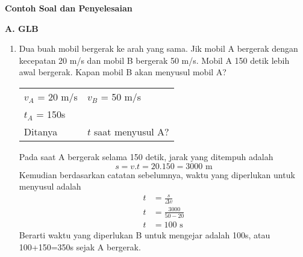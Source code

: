 \documentclass[10pt,a4paper]{article}
\newcommand{\unhide}[1]{
\begin{mybox}
#1\end{mybox}}
\begin{document}
\begin{multicols*}{2}
\begin{enumerate}[label=\Alph*.,topsep=0mm,leftmargin=*]
\end{enumerate}

\begin{catatan}\textbf{Contoh Soal dan Penyelesaian}\end{catatan}
\textbf{A. GLB}
\begin{enumerate}[topsep=0pt,itemsep=0pt,leftmargin=*]
\item Dua buah mobil bergerak ke arah yang sama. Jik mobil A bergerak dengan kecepatan 20 m/s dan mobil B bergerak 50 m/s. Mobil A 150 detik lebih awal bergerak. Kapan mobil B akan menyusul mobil A?

\unhide{
\begin{tabular}{ll}
$v_A$ = 20 m/s & $v_B$ = 50 m/s \\
$t_A$ = 150s &  \\
Ditanya & $t$ saat menyusul A? \\
\end{tabular}
Pada saat A bergerak selama 150 detik, jarak yang ditempuh adalah
$$s= v.t = 20.150 = 3000\text{ m}$$
Kemudian berdasarkan catatan sebelumnya, waktu yang diperlukan untuk menyusul adalah
\begin{align*}
t&=\frac{s}{\Delta v} \\
t&=\frac{3000}{50-20}\\
t&=100 \text{ s}
\end{align*}
Berarti waktu yang diperlukan B untuk mengejar adalah 100s, atau 100+150=350s sejak A bergerak.}


\end{enumerate}
\end{multicols*}
\end{document}
